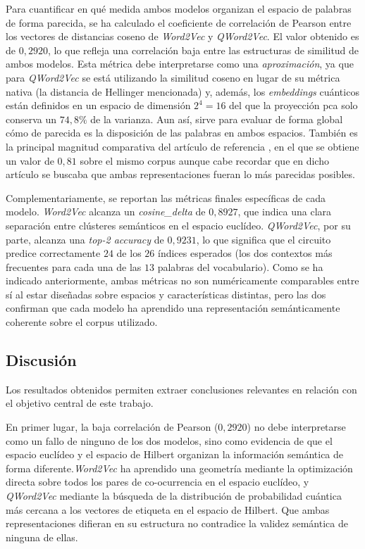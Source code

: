 Para cuantificar en qué medida ambos modelos organizan el espacio de palabras de forma parecida, se ha calculado el coeficiente de correlación de Pearson entre los vectores de distancias coseno de \textit{Word2Vec} y \textit{QWord2Vec}. El valor obtenido es de $0{,}2920$, lo que refleja una correlación baja entre las estructuras de similitud de ambos modelos. Esta métrica debe interpretarse como una \textit{aproximación}, ya que para \textit{QWord2Vec} se está utilizando la similitud coseno en lugar de su métrica nativa (la distancia de Hellinger mencionada) y, además, los \textit{embeddings} cuánticos están definidos en un espacio de dimensión $2^4 = 16$ del que la proyección \gls{pca} solo conserva un $74{,}8\%$ de la varianza. Aun así, sirve para evaluar de forma global cómo de parecida es la disposición de las palabras en ambos espacios. También es la principal magnitud comparativa del artículo de referencia \cite{ohno_qword2vec_2025}, en el que se obtiene un valor de $0{,}81$ sobre el mismo corpus aunque cabe recordar que en dicho artículo se buscaba que ambas representaciones fueran lo más parecidas posibles.

Complementariamente, se reportan las métricas finales específicas de cada modelo. \textit{Word2Vec} alcanza un \textit{cosine\_delta} de $0{,}8927$, que indica una clara separación entre clústeres semánticos en el espacio euclídeo. \textit{QWord2Vec}, por su parte, alcanza una \textit{top-2 accuracy} de $0{,}9231$, lo que significa que el circuito predice correctamente $24$ de los $26$ índices esperados (los dos contextos más frecuentes para cada una de las $13$ palabras del vocabulario). Como se ha indicado anteriormente, ambas métricas no son numéricamente comparables entre sí al estar diseñadas sobre espacios y características distintas, pero las dos confirman que cada modelo ha aprendido una representación semánticamente coherente sobre el corpus utilizado.

\subsection{Discusión}

Los resultados obtenidos permiten extraer conclusiones relevantes en relación con el objetivo central de este trabajo.

En primer lugar, la baja correlación de Pearson ($0{,}2920$) no debe interpretarse como un fallo de ninguno de los dos modelos, sino como evidencia de que el espacio euclídeo y el espacio de Hilbert organizan la información semántica de forma diferente.\textit{Word2Vec} ha aprendido una geometría mediante la optimización directa sobre todos los pares de co-ocurrencia en el espacio euclídeo, y \textit{QWord2Vec} mediante la búsqueda de la distribución de probabilidad cuántica más cercana a los vectores de etiqueta en el espacio de Hilbert. Que ambas representaciones difieran en su estructura no contradice la validez semántica de ninguna de ellas.

